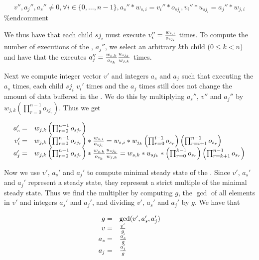 \begin{displaymath}
v'', a_j'', a_s'' \ne 0, \forall i \in \{0,\dots,n-1\}, a_s'' *
w_{s, i} = v_i'' * o_{sj_i}, v_i'' * u_{sj_i} = a_j'' * w_{j, i}
\end{displaymath}
\%end{comment}

We thus have that each child $sj_i$ must execute $v_i'' = {w_{s,i}
\over o_{sj_i}}$ times. To compute the number of executions of the
{\joiner}, $a_j''$, we select an arbitrary $k$th child ($0 \le k <
n$) and have that the {\joiner} executes $a_j'' = {{w_{s,k} \over
o_{s_k}}{u_{sj_k} \over w_{j,k}}}$ times.

Next we compute integer vector $v'$ and integers $a_s$ and $a_j$
such that executing the {\splitter} $a_s$ times, each child $sj_i$
$v_i'$ times and the {\joiner} $a_j$ times still does not change
the amount of data buffered in the {\splitjoin}. We do this by
multiplying $a_s''$, $v''$ and $a_j''$ by $w_{j,k}
\left(\prod_{r=0}^{n-1}o_{sj_r}\right)$. Thus we get

\begin{displaymath}
\begin{array}{rl}
a_s' = & w_{j,k} \left(\prod_{r=0}^{n-1}o_{sj_r}\right) \\
v_i' = & w_{j,k} \left(\prod_{r=0}^{n-1}o_{sj_r}\right) * {w_{s,i}
\over o_{sj_i}} = w_{s,i} * w_{j_k} \left( \prod_{r=0}^{i-1}
o_{s_r} \right) \left( \prod_{r=i+1}^{n-1} o_{s_r} \right)
\\
a_j' = & w_{j,k} \left(\prod_{r=0}^{n-1}o_{sj_r}\right) *
{{w_{s,k} \over o_{s_k}}{u_{sj_k} \over w_{j,k}}} = w_{s,k} *
u_{sj_k} * \left( \prod_{r=0}^{k-1} o_{s_r} \right)
\left( \prod_{r=k+1}^{n-1} o_{s_r} \right) \\
\end{array}
\end{displaymath}

Now we use $v'$, $a_s'$ and $a_j'$ to compute minimal steady state
of the {\splitjoin}.  Since $v'$, $a_s'$ and $a_j'$ represent a
steady state, they represent a strict multiple of the minimal
steady state.  Thus we find the multiplier by computing $g$, the
$\gcd$ of all elements in $v'$ and integers $a_s'$ and $a_j'$, and
dividing $v'$, $a_s'$ and $a_j'$ by $g$.  We have that

\begin{displaymath}
\begin{array}{rl}
g = & \gcd(v', a_s', a_j') \\
v = & v' \over g \\
a_s = &  a_s' \over g \\
a_j = & a_j' \over g
\end{array}
\end{displaymath}

